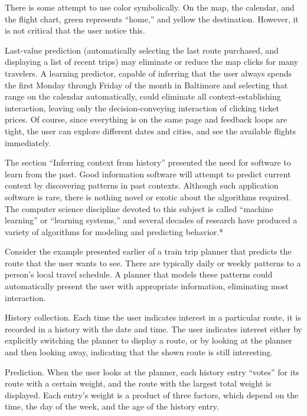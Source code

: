 {There is some attempt to use color symbolically. On the map, the calendar, and the flight chart, green represents “home,” and yellow the destination. However, it is not critical that the user notice this.

Last-value prediction (automatically selecting the last route purchased, and displaying a list of recent trips) may eliminate or reduce the map clicks for many travelers. A learning predictor, capable of inferring that the user always spends the first Monday through Friday of the month in Baltimore and selecting that range on the calendar automatically, could eliminate all context-establishing interaction, leaving only the decision-conveying interaction of clicking ticket prices. Of course, since everything is on the same page and feedback loops are tight, the user can explore different dates and cities, and see the available flights immediately.

The section “Inferring context from history” presented the need for software to learn from the past. Good information software will attempt to predict current context by discovering patterns in past contexts. Although such application software is rare, there is nothing novel or exotic about the algorithms required. The computer science discipline devoted to this subject is called “machine learning” or “learning systems,” and several decades of research have produced a variety of algorithms for modeling and predicting behavior.*

Consider the example presented earlier of a train trip planner that predicts the route that the user wants to see. There are typically daily or weekly patterns to a person’s local travel schedule. A planner that models these patterns could automatically present the user with appropriate information, eliminating most interaction.

History collection. Each time the user indicates interest in a particular route, it is recorded in a history with the date and time. The user indicates interest either by explicitly switching the planner to display a route, or by looking at the planner and then looking away, indicating that the shown route is still interesting.

Prediction. When the user looks at the planner, each history entry “votes” for its route with a certain weight, and the route with the largest total weight is displayed. Each entry’s weight is a product of three factors, which depend on the time, the day of the week, and the age of the history entry.

}
